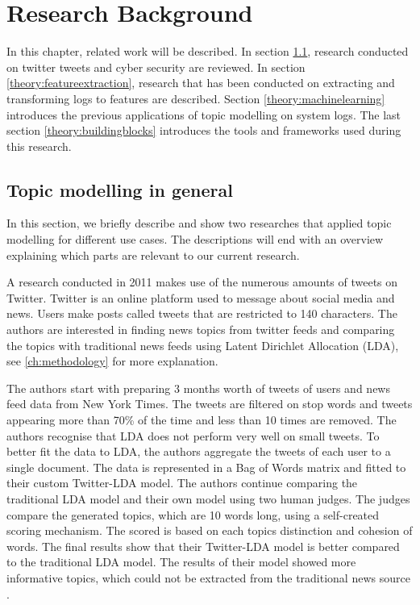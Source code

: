\chapter{Research Background}  \label{ch:theory}

\begin{comment}
\section{definitions}
\end{comment}

In this chapter, related work will be described. In section \ref{theory:relatedwork}, research conducted on twitter tweets and cyber security are reviewed. In section \ref{theory:featureextraction}, research that has been conducted on extracting and transforming logs to features are described. Section \ref{theory:machinelearning} introduces the previous applications of topic modelling on system logs. The last section \ref{theory:buildingblocks} introduces the tools and frameworks used during this research.

\section{Topic modelling in general} \label{theory:relatedwork}
In this section, we briefly describe and show two researches that applied topic modelling for different use cases. The descriptions will end with an overview explaining which parts are relevant to our current research. \par

\setlength{\parindent}{3ex} A research conducted in 2011 makes use of the numerous amounts of tweets on Twitter. Twitter is an online platform used to message about social media and news. Users make posts called tweets that are restricted to 140 characters. The authors are interested in finding news topics from twitter feeds and comparing the topics with traditional news feeds using Latent Dirichlet Allocation (LDA), see \ref{ch:methodology} for more explanation.

The authors start with preparing 3 months worth of tweets of users and news feed data from New York Times. The tweets are filtered on stop words and tweets appearing more than 70\% of the time and less than 10 times are removed. The authors recognise that LDA does not perform very well on small tweets. To better fit the data to LDA, the authors aggregate the tweets of each user to a single document. The data is represented in a Bag of Words matrix and fitted to their custom Twitter-LDA model. The authors continue comparing the traditional LDA model and their own model using two human judges. The judges compare the generated topics, which are 10 words long, using a self-created scoring mechanism. The scored is based on each topics distinction and cohesion of words. The final results show that their Twitter-LDA model is better compared to the traditional LDA model. The results of their model showed more informative topics, which could not be extracted from the traditional news source \cite{Zhao2011ComparingModels}. 

